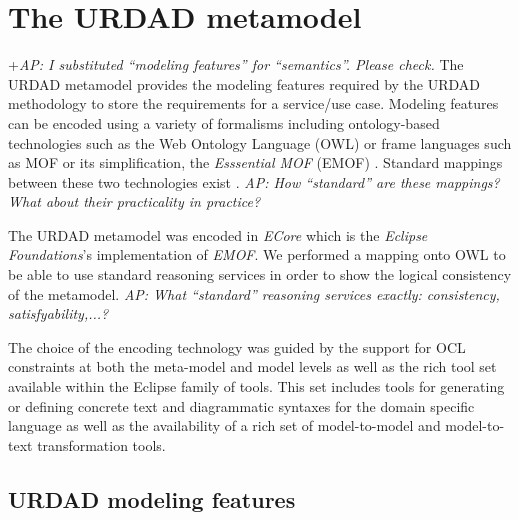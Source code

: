 \section{The URDAD metamodel \label{sec:metamodel}}

+\emph{AP: I substituted ``modeling features'' for ``semantics''. Please check.} The URDAD metamodel provides the modeling features required by the URDAD methodology to store the requirements for a service/use case. Modeling features can be encoded using a variety of formalisms including ontology-based technologies such as the Web Ontology Language (OWL) \cite{} or frame languages such as MOF or its simplification, the {\em Esssential MOF} (EMOF) \cite{}. Standard mappings between these two technologies exist \cite{staab_model_2010}. \emph{AP: How ``standard'' are these mappings? What about their practicality in practice?}

The URDAD metamodel was encoded in {\em ECore} which is the {\em Eclipse Foundations}'s implementation of {\em EMOF}. We performed a mapping onto OWL to be able to use standard reasoning services in order to show the logical consistency of the metamodel. \emph{AP: What ``standard'' reasoning services exactly: consistency, satisfyability,...?}

The choice of the encoding technology was guided by the support for OCL constraints at both the meta-model and model levels as well as the rich tool set available within the Eclipse family of tools. This set includes tools for generating or defining concrete text and diagrammatic syntaxes for the domain specific language as well as the availability of a rich set of model-to-model and model-to-text transformation tools.


\subsection{URDAD modeling features}

